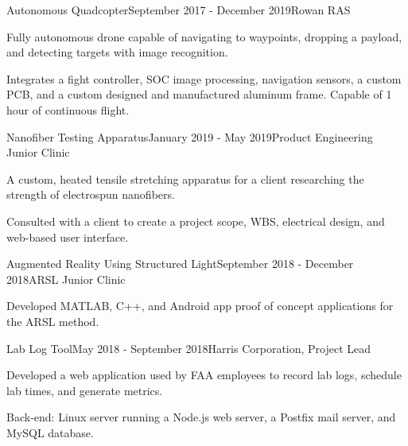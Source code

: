{  \begin{rSubsection}{Autonomous Quadcopter}{September 2017 - December 2019}{Rowan
    RAS}{}
  \item Fully autonomous drone capable of navigating to waypoints, dropping a
    payload, and detecting targets with image recognition.
  \item Integrates a fight controller, SOC image processing, navigation sensors,
    a custom PCB, and a custom designed and manufactured aluminum frame. Capable
    of 1 hour of continuous flight.
  \end{rSubsection}


  \begin{rSubsection}{Nanofiber Testing Apparatus}{January 2019 - May 2019}{Product Engineering Junior Clinic}{}
  \item A custom, heated tensile stretching apparatus for a client researching the strength of electrospun nanofibers.
  \item Consulted with a client to create a project scope, WBS, electrical
    design, and web-based user interface.
  \end{rSubsection}


  \begin{rSubsection}{Augmented Reality Using Structured Light}{September
    2018 - December 2018}{ARSL Junior Clinic}{}
  \item Developed MATLAB, C++, and Android app proof of concept applications for the ARSL method.
  \end{rSubsection}


  \begin{rSubsection}{Lab Log Tool}{May 2018 - September 2018}{Harris Corporation, Project Lead}{}
  \item Developed a web application used by FAA employees to record lab logs, schedule lab times, and generate metrics.
  \item Back-end: Linux server running a Node.js web server, a Postfix mail server, and MySQL database.
  \end{rSubsection}

  }

